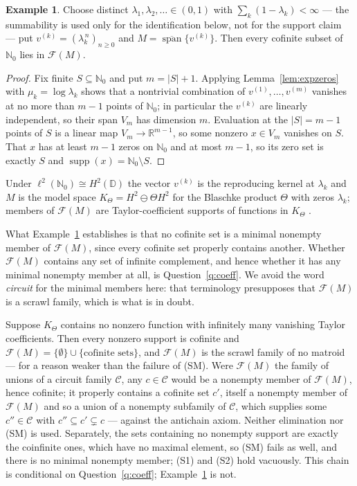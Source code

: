 \documentclass[11pt,reqno]{amsart}
\theoremstyle{definition}
\newtheorem{example}[theorem]{Example}
\DeclareMathOperator{\supp}{supp}
\DeclareMathOperator{\spann}{span}
\newcommand{\N}{\mathbb{N}}
\newcommand{\R}{\mathbb{R}}
\newcommand{\D}{\mathbb{D}}
\newcommand{\F}{\mathcal{F}}
\begin{document}
\begin{example}\label{ex:modelspace}
Choose distinct $\lambda_1,\lambda_2,\dots\in(0,1)$ with
$\sum_k(1-\lambda_k)<\infty$ --- the summability is used only for the
identification below, not for the support claim --- put $v^{(k)}=(\lambda_k^{\,n})_{n\ge0}$ and
$M=\overline{\spann}\{v^{(k)}\}$. Then every cofinite subset of $\N_0$ lies in
$\F(M)$.
\end{example}

\begin{proof}
Fix finite $S\subseteq\N_0$ and put $m=|S|+1$. Applying
Lemma~\ref{lem:expzeros} with $\mu_k=\log\lambda_k$ shows that a nontrivial
combination of $v^{(1)},\dots,v^{(m)}$ vanishes at no more than $m-1$ points of
$\N_0$; in particular the $v^{(k)}$ are linearly independent, so their span
$V_m$ has dimension $m$. Evaluation at the $|S|=m-1$ points of $S$ is a linear
map $V_m\to\R^{m-1}$, so some nonzero $x\in V_m$ vanishes on $S$. That $x$ has
at least $m-1$ zeros on $\N_0$ and at most $m-1$, so its zero set is exactly
$S$ and $\supp(x)=\N_0\setminus S$.
\end{proof}

Under $\ell^2(\N_0)\cong H^2(\D)$ the vector $v^{(k)}$ is the reproducing
kernel at $\lambda_k$ and $M$ is the model space $K_\Theta=H^2\ominus\Theta H^2$
for the Blaschke product $\Theta$ with zeros $\lambda_k$; members of $\F(M)$ are
Taylor-coefficient supports of functions in $K_\Theta$ \cite{GMR16}.

What Example~\ref{ex:modelspace} establishes is that no cofinite set is a
minimal nonempty member of $\F(M)$, since every cofinite set properly contains
another. Whether $\F(M)$ contains any set of infinite complement, and hence
whether it has any minimal nonempty member at all, is
Question~\ref{q:coeff}. We avoid the word \emph{circuit} for the minimal
members here: that terminology presupposes that $\F(M)$ is a scrawl family,
which is what is in doubt.

Suppose $K_\Theta$ contains no nonzero function with infinitely many vanishing
Taylor coefficients. Then every nonzero support is cofinite and
$\F(M)=\{\emptyset\}\cup\{\text{cofinite sets}\}$, and $\F(M)$ is the scrawl
family of no matroid --- for a reason weaker than the failure of (SM). Were
$\F(M)$ the family of unions of a circuit family $\mathcal C$, any $c\in\mathcal
C$ would be a nonempty member of $\F(M)$, hence cofinite; it properly contains
a cofinite set $c'$, itself a nonempty member of $\F(M)$ and so a union of a
nonempty subfamily of $\mathcal C$, which supplies some $c''\in\mathcal C$ with
$c''\subseteq c'\subsetneq c$ --- against the antichain axiom. Neither
elimination nor (SM) is used. Separately, the sets containing no nonempty
support are exactly the coinfinite ones, which have no maximal element, so
(SM) fails as well, and there is no minimal nonempty member; (S1) and (S2)
hold vacuously. This chain is conditional on Question~\ref{q:coeff};
Example~\ref{ex:modelspace} is not.
\end{document}
